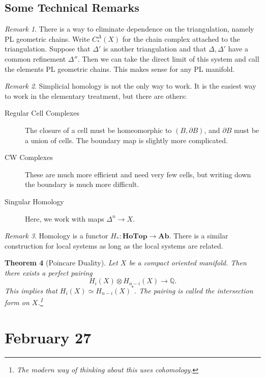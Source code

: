 \documentclass[leqno, openany]{memoir}
\newtheorem{thm}{Theorem}[chapter]
\theoremstyle{definition}
\theoremstyle{remark}
\newtheorem{rmk}[thm]{Remark}
\theoremstyle{plain}
\theoremstyle{definition}
\theoremstyle{remark}
\newcommand{\Q}{\mathbb{Q}}
\begin{document}
\section{Some Technical Remarks}%
\label{sec:some_technical_remarks}

\begin{rmk}
    There is a way to eliminate dependence on the triangulation, namely PL geometric chains. Write $C_*^{\Delta}(X)$ for the chain complex attached to the triangulation. Suppose that $\Delta'$ is another triangulation and that $\Delta, \Delta'$ have a common refinement $\Delta''$. Then we can take the direct limit of this system and call the elements PL geometric chains. This makes sense for any PL manifold.
\end{rmk}

\begin{rmk}
    Simplicial homology is not the only way to work. It is the easiest way to work in the elementary treatment, but there are others:
    \begin{description}
        \item[Regular Cell Complexes] The closure of a cell must be homeomorphic to $(B, \partial B)$, and $\partial B$ must be a union of cells. The boundary map is slightly more complicated.
        \item[CW Complexes] These are much more efficient and need very few cells, but writing down the boundary is much more difficult.
        \item[Singular Homology] Here, we work with maps $\Delta^n \to X$.
    \end{description}
\end{rmk}

\begin{rmk}
    Homology is a functor $H_*: \mathbf{HoTop} \to \mathbf{Ab}$. There is a similar construction for local systems as long as the local systems are related.
\end{rmk}

\begin{thm}[Poincare Duality]
    Let $X$ be a compact oriented manifold. Then there exists a perfect pairing
    \[ H_i(X) \otimes H_{n-i}(X) \to \Q. \]
    This implies that $H_i(X) \simeq H_{n-i}(X)^*$. The pairing is called the \emph{intersection form} on $X$.\footnote{The modern way of thinking about this uses cohomology.}
\end{thm}

\chapter{February 27}%
\label{cha:february_27}
\end{document}
